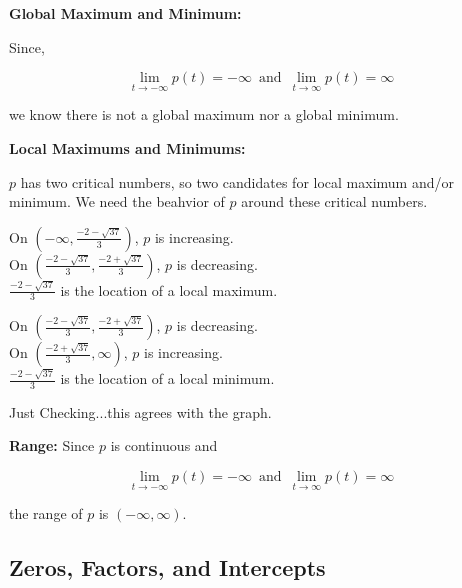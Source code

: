 \documentclass{ximera}
\begin{document}
\begin{example}
\textbf{Global Maximum and Minimum:} 


Since, 

\[  \lim\limits_{t \to -\infty} p(t) = -\infty   \, \text{ and } \,   \lim\limits_{t \to \infty} p(t) = \infty \]

we know there is not a global maximum nor a global minimum.



\textbf{Local Maximums and Minimums:} 

$p$ has two critical numbers, so two candidates for local maximum and/or minimum. We need the beahvior of $p$ around these critical numbers.



On $\left(-\infty, \frac{-2 - \sqrt{37}}{3} \right)$, $p$ is increasing. \\
On $\left(\frac{-2 - \sqrt{37}}{3}, \frac{-2 + \sqrt{37}}{3} \right)$, $p$ is decreasing. \\
$\frac{-2 - \sqrt{37}}{3}$ is the location of a local maximum.


On $\left(\frac{-2 - \sqrt{37}}{3}, \frac{-2 + \sqrt{37}}{3} \right)$, $p$ is decreasing. \\
On $\left( \frac{-2 + \sqrt{37}}{3}, \infty \right)$, $p$ is increasing. \\
$\frac{-2 - \sqrt{37}}{3}$ is the location of a local minimum.


Just Checking...this agrees with the graph.


\textbf{Range:}  Since $p$ is continuous and

 \[  \lim\limits_{t \to -\infty} p(t) = -\infty   \, \text{ and } \,   \lim\limits_{t \to \infty} p(t) = \infty \]


 the range of $p$ is $(-\infty, \infty)$.

\end{example}
































\subsection*{Zeros, Factors, and Intercepts}
\end{document}
